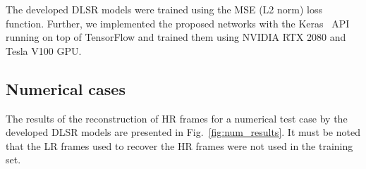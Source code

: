 The developed DLSR models were trained using the MSE (L2 norm) loss function.
Further, we implemented the proposed networks with the Keras~\cite{chollet2015keras} API running on top of TensorFlow and trained them using NVIDIA RTX 2080 and Tesla V100 GPU.
\clearpage
\subsection{Numerical cases}
The results of the reconstruction of HR frames for a numerical test case by the developed DLSR models are presented in Fig.~\ref{fig:num_results}.
It must be noted that the LR frames used to recover the HR frames were not used in the training set.

